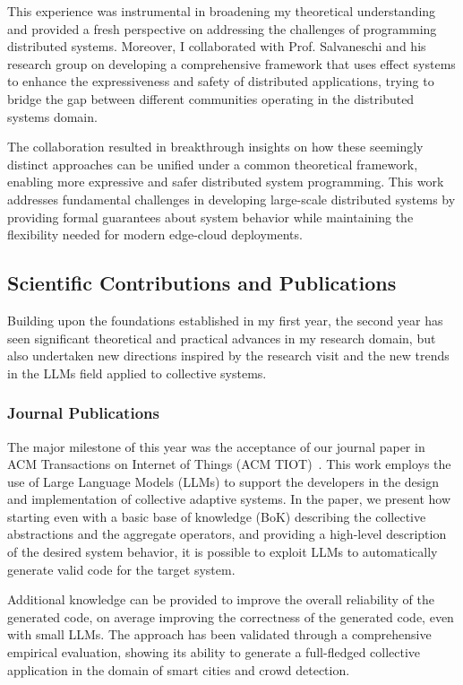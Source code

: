 \documentclass[runningheads]{llncs}
\begin{document}
This experience was instrumental in broadening my theoretical understanding and provided a fresh perspective on addressing the challenges of programming distributed systems.
%
Moreover,
I collaborated with Prof. Salvaneschi and his research group on developing a comprehensive framework that uses effect systems to enhance the expressiveness and safety of distributed applications,
trying to bridge the gap between different communities operating in the distributed systems domain.

The collaboration resulted in breakthrough insights on how these seemingly distinct approaches can be unified under a common theoretical framework,
enabling more expressive and safer distributed system programming.
%
This work addresses fundamental challenges in developing large-scale distributed systems by providing formal guarantees about system behavior while maintaining the flexibility needed for modern edge-cloud deployments.

\subsection{Scientific Contributions and Publications}
Building upon the foundations established in my first year,
the second year has seen significant theoretical and practical advances in my research domain,
but also undertaken new directions inspired by the research visit and the new trends in the LLMs field applied to collective systems.

\subsubsection{Journal Publications}
The major milestone of this year was the acceptance of our journal paper in ACM Transactions on Internet of Things (ACM TIOT)~\cite{10.1145/3758326}.
%
This work employs the use of Large Language Models (LLMs) to support the developers in the design and implementation of collective adaptive systems.
%
In the paper,
we present how starting even with a basic base of knowledge (BoK) describing the collective abstractions and the aggregate operators,
and providing a high-level description of the desired system behavior,
it is possible to exploit LLMs to automatically generate valid code for the target system.

Additional knowledge can be provided to improve the overall reliability of the generated code,
on average improving the correctness of the generated code,
even with small LLMs.
%
The approach has been validated through a comprehensive empirical evaluation,
showing its ability to generate a full-fledged collective application in the domain of smart cities and crowd detection.
\end{document}
